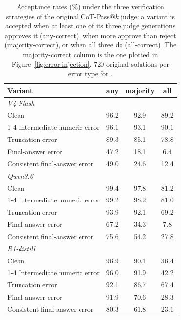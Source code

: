 \begin{table}[t]
\centering
\footnotesize
\begin{tabular}{lccc}
\toprule
Variant & any & majority & all \\
\midrule
\multicolumn{4}{l}{\textit{V4-Flash}} \\
Clean & 96.2 & 92.9 & 89.2 \\
\cmidrule(lr){1-4}
Intermediate numeric error & 96.1 & 93.1 & 90.1 \\
Truncation error & 89.3 & 85.1 & 78.8 \\
Final-answer error & 47.2 & 18.1 & 6.4 \\
Consistent final-answer error & 49.0 & 24.6 & 12.4 \\
\midrule
\multicolumn{4}{l}{\textit{Qwen3.6}} \\
Clean & 99.4 & 97.8 & 81.2 \\
\cmidrule(lr){1-4}
Intermediate numeric error & 99.2 & 98.2 & 81.0 \\
Truncation error & 93.9 & 92.1 & 69.2 \\
Final-answer error & 67.2 & 34.3 & 7.8 \\
Consistent final-answer error & 75.6 & 54.2 & 27.8 \\
\midrule
\multicolumn{4}{l}{\textit{R1-distill}} \\
Clean & 96.9 & 90.1 & 36.4 \\
\cmidrule(lr){1-4}
Intermediate numeric error & 96.0 & 91.9 & 42.2 \\
Truncation error & 92.1 & 86.7 & 67.4 \\
Final-answer error & 91.9 & 70.6 & 28.3 \\
Consistent final-answer error & 80.3 & 61.8 & 23.1 \\
\bottomrule
\end{tabular}
\caption{Acceptance rates (\%) under the three verification strategies of the original CoT-Pass@$k$ judge: a variant is accepted when at least one of its three judge generations approves it (any-correct), when more approve than reject (majority-correct), or when all three do (all-correct). The majority-correct column is the one plotted in Figure~\ref{fig:error-injection}. 720 original solutions per error type for .}
\label{tab:error-rules}
\end{table}
